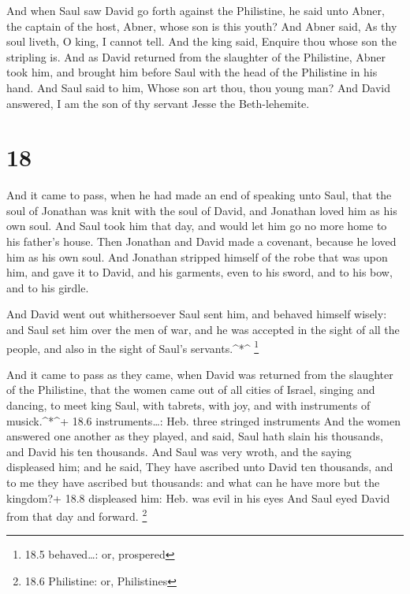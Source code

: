  And when Saul saw David go forth against the Philistine,
he said unto Abner, the captain of the host, Abner, whose son is this
youth? And Abner said, As thy soul liveth, O king, I cannot tell.
 And the king said, Enquire thou whose son the stripling
is.  And as David returned from the slaughter of the
Philistine, Abner took him, and brought him before Saul with the head of
the Philistine in his hand.  And Saul said to him, Whose
son art thou, thou young man? And David answered, I am the son of thy
servant Jesse the Beth-lehemite.

\hypertarget{section-17}{%
\section{18}\label{section-17}}

 And it came to pass, when he had made an end of speaking
unto Saul, that the soul of Jonathan was knit with the soul of David,
and Jonathan loved him as his own soul.  And Saul took him
that day, and would let him go no more home to his father's house.
 Then Jonathan and David made a covenant, because he loved
him as his own soul.  And Jonathan stripped himself of the
robe that was upon him, and gave it to David, and his garments, even to
his sword, and to his bow, and to his girdle.

 And David went out whithersoever Saul sent him, and behaved
himself wisely: and Saul set him over the men of war, and he was
accepted in the sight of all the people, and also in the sight of Saul's
servants.\^{}*\^{} \footnote{18.5 behaved\ldots: or, prospered}

 And it came to pass as they came, when David was returned
from the slaughter of the Philistine, that the women came out of all
cities of Israel, singing and dancing, to meet king Saul, with tabrets,
with joy, and with instruments of musick.\^{}*\^{}+ 18.6
instruments\ldots: Heb. three stringed instruments  And the
women answered one another as they played, and said, Saul hath slain his
thousands, and David his ten thousands.  And Saul was very
wroth, and the saying displeased him; and he said, They have ascribed
unto David ten thousands, and to me they have ascribed but thousands:
and what can he have more but the kingdom?+ 18.8 displeased him: Heb.
was evil in his eyes  And Saul eyed David from that day and
forward. \footnote{18.6 Philistine: or, Philistines}

